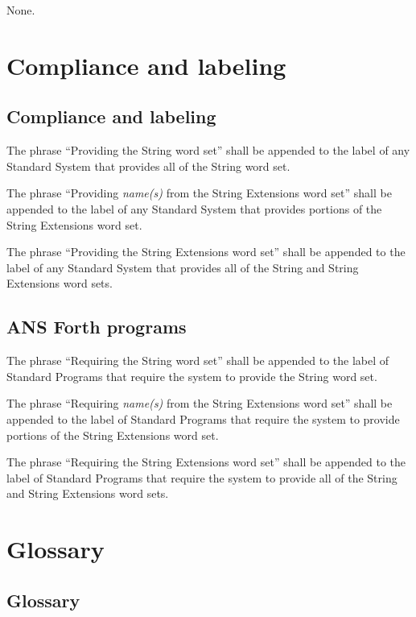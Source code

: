 None.

\section{Compliance and labeling} %

\subsection{Compliance and labeling} %

The phrase ``Providing the String word set'' shall be appended to
the label of any Standard System that provides all of the String
word set.

The phrase ``Providing \emph{name(s)} from the String Extensions
word set'' shall be appended to the label of any Standard System
that provides portions of the String Extensions word set.

The phrase ``Providing the String Extensions word set'' shall be
appended to the label of any Standard System that provides all of
the String and String Extensions word sets.

\subsection{ANS Forth programs} %

The phrase ``Requiring the String word set'' shall be appended to
the label of Standard Programs that require the system to provide
the String word set.

The phrase ``Requiring \emph{name(s)} from the String Extensions
word set'' shall be appended to the label of Standard Programs that
require the system to provide portions of the String Extensions
word set.

The phrase ``Requiring the String Extensions word set'' shall be
appended to the label of Standard Programs that require the system
to provide all of the String and String Extensions word sets.


\section{Glossary} %

\begin{info}
\subsection{Glossary}
\end{info}

